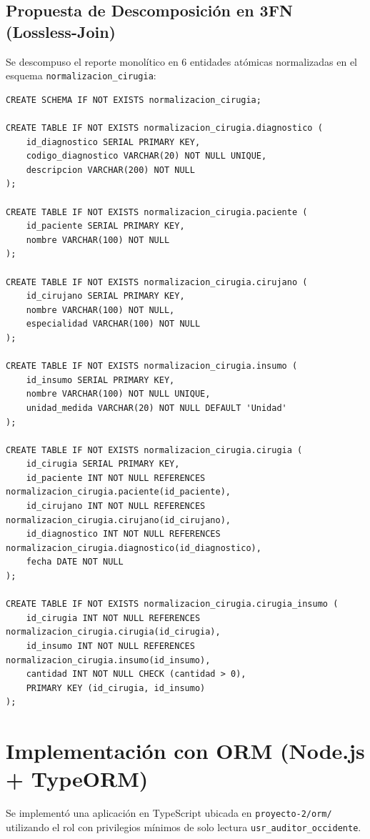 \documentclass[11pt,a4paper]{article}
\begin{document}
\subsection{Propuesta de Descomposición en 3FN (Lossless-Join)}
Se descompuso el reporte monolítico en 6 entidades atómicas normalizadas en el esquema \texttt{normalizacion\_cirugia}:
\begin{lstlisting}[style=sqlstyle]
CREATE SCHEMA IF NOT EXISTS normalizacion_cirugia;

CREATE TABLE IF NOT EXISTS normalizacion_cirugia.diagnostico (
    id_diagnostico SERIAL PRIMARY KEY,
    codigo_diagnostico VARCHAR(20) NOT NULL UNIQUE,
    descripcion VARCHAR(200) NOT NULL
);

CREATE TABLE IF NOT EXISTS normalizacion_cirugia.paciente (
    id_paciente SERIAL PRIMARY KEY,
    nombre VARCHAR(100) NOT NULL
);

CREATE TABLE IF NOT EXISTS normalizacion_cirugia.cirujano (
    id_cirujano SERIAL PRIMARY KEY,
    nombre VARCHAR(100) NOT NULL,
    especialidad VARCHAR(100) NOT NULL
);

CREATE TABLE IF NOT EXISTS normalizacion_cirugia.insumo (
    id_insumo SERIAL PRIMARY KEY,
    nombre VARCHAR(100) NOT NULL UNIQUE,
    unidad_medida VARCHAR(20) NOT NULL DEFAULT 'Unidad'
);

CREATE TABLE IF NOT EXISTS normalizacion_cirugia.cirugia (
    id_cirugia SERIAL PRIMARY KEY,
    id_paciente INT NOT NULL REFERENCES normalizacion_cirugia.paciente(id_paciente),
    id_cirujano INT NOT NULL REFERENCES normalizacion_cirugia.cirujano(id_cirujano),
    id_diagnostico INT NOT NULL REFERENCES normalizacion_cirugia.diagnostico(id_diagnostico),
    fecha DATE NOT NULL
);

CREATE TABLE IF NOT EXISTS normalizacion_cirugia.cirugia_insumo (
    id_cirugia INT NOT NULL REFERENCES normalizacion_cirugia.cirugia(id_cirugia),
    id_insumo INT NOT NULL REFERENCES normalizacion_cirugia.insumo(id_insumo),
    cantidad INT NOT NULL CHECK (cantidad > 0),
    PRIMARY KEY (id_cirugia, id_insumo)
);
\end{lstlisting}

\newpage

\section{Implementación con ORM (Node.js + TypeORM)}
Se implementó una aplicación en TypeScript ubicada en \texttt{proyecto-2/orm/} utilizando el rol con privilegios mínimos de solo lectura \texttt{usr\_auditor\_occidente}.
\end{document}
